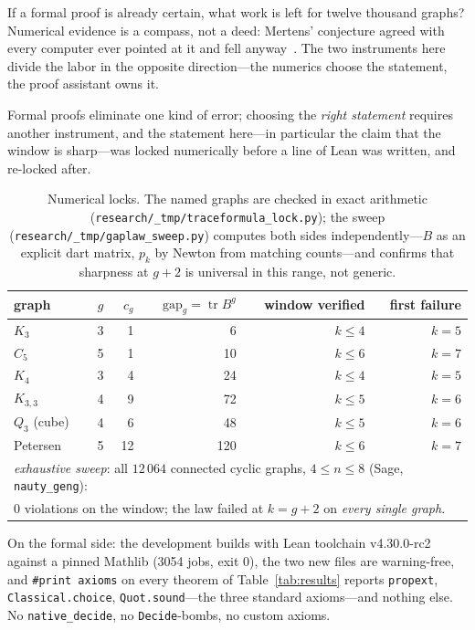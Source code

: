 \documentclass[11pt]{article}
\newcommand{\lean}[1]{\texttt{#1}}
\DeclareMathOperator{\tr}{tr}
\begin{document}
If a formal proof is already certain, what work is left for twelve thousand graphs?
Numerical evidence is a compass, not a deed: Mertens' conjecture agreed with every computer
ever pointed at it and fell anyway~\cite{OdlyzkoTeRiele1985}. The two instruments here divide
the labor in the opposite direction---the numerics choose the statement, the proof assistant
owns it.

Formal proofs eliminate one kind of error; choosing the \emph{right statement} requires
another instrument, and the statement here---in particular the claim that the window is
sharp---was locked numerically before a line of Lean was written, and re-locked after.

\begin{table}[h]
\centering\small
{}
\begin{tabular}{@{}lrrrrr@{}}
\toprule
\rowcolor{ggteal!18} graph & $g$ & $c_g$ & $\mathrm{gap}_g = \tr B^g$ & window verified & first failure \\
\midrule
$K_3$        & 3 & 1  & 6   & $k \le 4$ & $k=5$ \\
$C_5$        & 5 & 1  & 10  & $k \le 6$ & $k=7$ \\
$K_4$        & 3 & 4  & 24  & $k \le 4$ & $k=5$ \\
$K_{3,3}$    & 4 & 9  & 72  & $k \le 5$ & $k=6$ \\
$Q_3$ (cube) & 4 & 6  & 48  & $k \le 5$ & $k=6$ \\
Petersen     & 5 & 12 & 120 & $k \le 6$ & $k=7$ \\
\midrule
\multicolumn{6}{l}{\emph{exhaustive sweep}: all $12\,064$ connected cyclic graphs, $4 \le n \le 8$
(Sage, \lean{nauty\_geng}):} \\
\multicolumn{6}{l}{\quad $0$ violations on the window; the law failed at $k = g+2$ on
\emph{every single graph}.} \\
\bottomrule
\end{tabular}
\caption{Numerical locks. The named graphs are checked in exact arithmetic
(\lean{research/\_tmp/traceformula\_lock.py}); the sweep
(\lean{research/\_tmp/gaplaw\_sweep.py}) computes both sides independently---$B$ as an
explicit dart matrix, $p_k$ by Newton from matching counts---and confirms that sharpness at
$g+2$ is universal in this range, not generic.}
\label{tab:locks}
\end{table}

On the formal side: the development builds with Lean toolchain v4.30.0-rc2 against a pinned
Mathlib (3054 jobs, exit 0), the two new files are warning-free, and
\lean{\#print axioms} on every theorem of Table~\ref{tab:results} reports
\lean{propext}, \lean{Classical.choice}, \lean{Quot.sound}---the three standard axioms---and
nothing else. No \lean{native\_decide}, no \lean{Decide}-bombs, no custom axioms.
\end{document}

